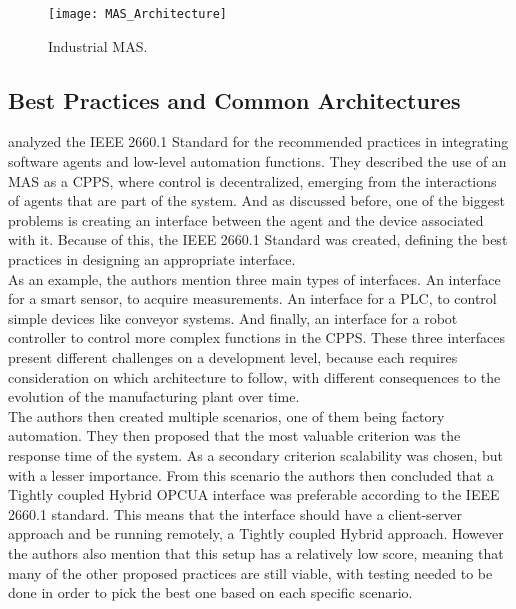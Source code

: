 \begin{figure}[h!]
	\centering
	\texttt{[image: MAS\_Architecture]}
	\caption{Industrial \acrlong{MAS}.}
	\label{fig:MAS_Architecture}
\end{figure}

\subsection{Best Practices and Common Architectures}
\label{subsec:best_practices_and_common_architectures}

\citeauthor{Leitao2021} \cite{Leitao2021} analyzed the IEEE 2660.1 Standard for the recommended practices in integrating software agents and low-level automation functions. They described the use of an \acrshort{MAS} as a \acrshort{CPPS}, where control is decentralized, emerging from the interactions of agents that are part of the system. And as discussed before, one of the biggest problems is creating an interface between the agent and the device associated with it. Because of this, the IEEE 2660.1 Standard was created, defining the best practices in designing an appropriate interface.\\

As an example, the authors mention three main types of interfaces. An interface for a smart sensor, to acquire measurements. An interface for a \acrshort{PLC}, to control simple devices like conveyor systems. And finally, an interface for a robot controller to control more complex functions in the \acrshort{CPPS}. These three interfaces present different challenges on a development level, because each requires consideration on which architecture to follow, with different consequences to the evolution of the manufacturing plant over time.\\

The authors then created multiple scenarios, one of them being factory automation. They then proposed that the most valuable criterion was the response time of the system. As a secondary criterion scalability was chosen, but with a lesser importance. From this scenario the authors then concluded that a Tightly coupled Hybrid \acrshort{OPCUA} interface was preferable according to the IEEE 2660.1 standard. This means that the interface should have a client-server approach and be running remotely, a Tightly coupled Hybrid approach. However the authors also mention that this setup has a relatively low score, meaning that many of the other proposed practices are still viable, with testing needed to be done in order to pick the best one based on each specific scenario.\\


